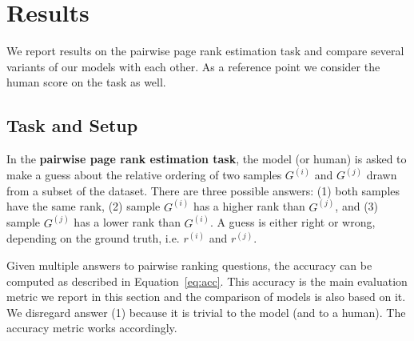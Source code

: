 \section{Results}
\label{sec:results}

We report results on the pairwise page rank estimation task and compare several variants of our models with each other. As a reference point we consider the human score on the task as well.

\subsection{Task and Setup}

In the \textbf{pairwise page rank estimation task}, the model (or human) is asked to make a guess about the relative ordering of two samples $G^{(i)}$ and $G^{(j)}$ drawn from a subset of the dataset.
There are three possible answers: (1) both samples have the same rank, (2) sample $G^{(i)}$ has a higher rank than $G^{(j)}$, and (3) sample $G^{(j)}$ has a lower rank than $G^{(i)}$. A guess is either right or wrong, depending on the ground truth, i.e. $r^{(i)}$ and $r^{(j)}$.

Given multiple answers to pairwise ranking questions, the accuracy can be computed as described in Equation~\ref{eq:acc}. This accuracy is the main evaluation metric we report in this section and the comparison of models is also based on it. We disregard answer (1) because it is trivial to the model (and to a human). The accuracy metric works accordingly.

